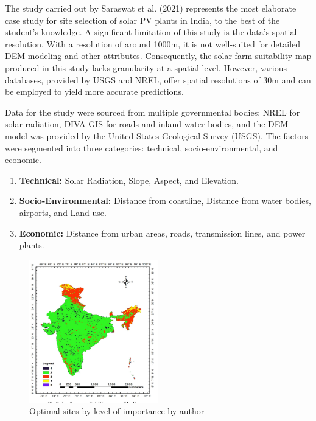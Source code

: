\documentclass[a4paper,12pt]{Classes/RoboticsLaTeX}
\begin{document}
	The study carried out by Saraswat et al. (2021) represents the most elaborate case study for site selection of solar \ac{PV} plants in India, 
	to the best of the student's knowledge\cite{saraswat2021}. A significant limitation of this study is the data's spatial resolution. With a resolution of 
	around 1000m, it is not well-suited for detailed DEM modeling and other attributes. Consequently, the solar farm suitability map produced in this study lacks
	 granularity at a spatial level. However, various databases, provided by USGS and \ac{NREL}, offer spatial resolutions of 30m and can be employed to yield more accurate predictions.

	Data for the study were sourced from multiple governmental bodies: \ac{NREL} for solar radiation, DIVA-GIS for roads and inland water bodies, and the DEM model was provided by the United States Geological Survey (USGS). The factors were segmented into three categories: technical, socio-environmental, and economic.
	\begin{enumerate}
		\item \textbf{Technical:} Solar Radiation, Slope, Aspect, and Elevation.
		\item \textbf{Socio-Environmental:} Distance from coastline, Distance from water bodies, airports, and Land use.
		\item \textbf{Economic:} Distance from urban areas, roads, transmission lines, and power plants.
	\end{enumerate}

	\begin{figure}[H]
		\centering
		\includegraphics[width=0.5\textwidth]{Figures/Saraswat.png} %
		\caption{ Optimal sites by level of importance by author \cite{saraswat2021}}
		\label{fig:my_label} %
	\end{figure}
	
\end{document}
